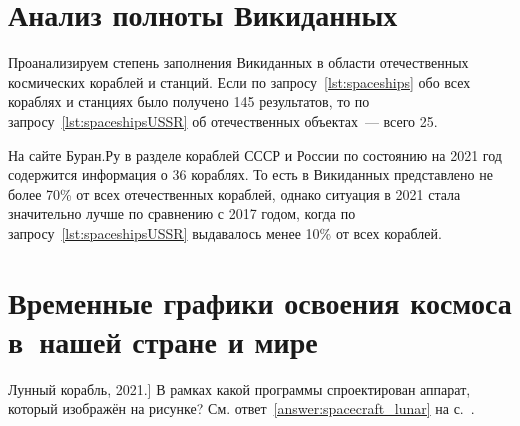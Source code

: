\section{Анализ полноты Викиданных}

Проанализируем степень заполнения Викиданных в области отечественных космических кораблей и станций. 
Если по запросу~\ref{lst:spaceships} обо всех кораблях и станциях было получено 145 результатов, 
то по запросу~\ref{lst:spaceshipsUSSR} об отечественных объектах~--- всего 25. 

На сайте Буран.Ру в разделе кораблей СССР и России по состоянию на 2021 год содержится информация о 36 кораблях\autocite{spacecraftBuran}. То есть в Викиданных представлено не более 70\% от всех отечественных кораблей, однако ситуация в 2021 стала значительно лучше по сравнению с 2017 годом, когда по запросу~\ref{lst:spaceshipsUSSR} выдавалось менее 10\% от всех кораблей. 


\section{Временные графики освоения космоса в~нашей стране и мире}

\begin{marginfigure}
{
	\setlength{\fboxsep}{0pt}%
	\setlength{\fboxrule}{1pt}%
}
\caption
[Лунный корабль, 2021.]
{
В рамках какой программы спроектирован аппарат, который изображён на рисунке?
См. ответ~\ref{answer:spacecraft_lunar} на с.~\pageref{answer:spacecraft_lunar}.
}
\label{question:spacecraft_lunar}
\end{marginfigure}

